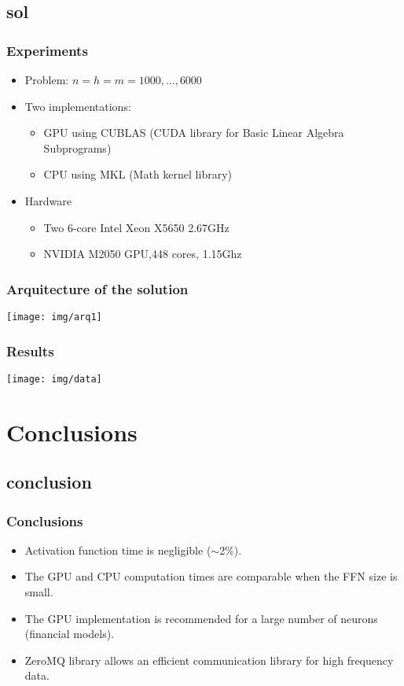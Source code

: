 \subsection{sol}
\begin{frame}
  \frametitle{Experiments}
  \begin{itemize}
    \item Problem: $n=h=m=1000,\dots,6000$
    \item Two implementations:
    \begin{itemize}
    \item GPU using CUBLAS (CUDA library for Basic Linear Algebra
    Subprograms)
    \item CPU using MKL (Math kernel library)    
    \end{itemize}
    \item Hardware
    \begin{itemize}
    \item Two 6-core Intel Xeon X5650 2.67GHz
    \item NVIDIA M2050 GPU,448 cores, 1.15Ghz    
    \end{itemize}
  \end{itemize}
\end{frame}

\begin{frame}
  \frametitle{Arquitecture of the solution}
  \begin{center}
  \texttt{[image: img/arq1]}    
  \end{center}
\end{frame}
\begin{frame}
\frametitle{Results}
    \begin{center}
     \texttt{[image: img/data]}    
    \end{center}
\end{frame}

\section{Conclusions}
\subsection{conclusion}

\begin{frame}
  \frametitle{Conclusions}
  \begin{itemize}
    \item Activation function time is negligible ($\sim$2\%).
    \item The GPU and CPU computation times are comparable when the
    FFN size is small.
    \item The GPU implementation is recommended for a large number of
    neurons (financial models).
    \item ZeroMQ library allows an efficient communication library for
    high frequency data.
  \end{itemize}
\end{frame}



